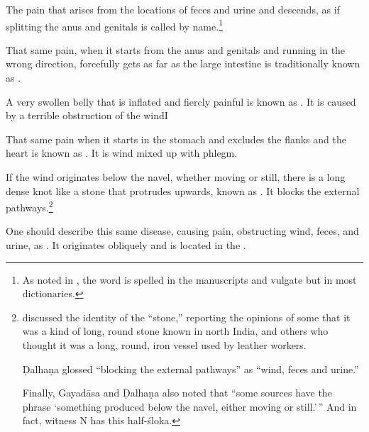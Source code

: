 \begin{translation}
\item[86]

The pain that arises from the locations of feces and urine and
descends, as if splitting the anus and genitals is called
 by name.\footnote{As noted in \cite[124,
    n.\,74]{wuja-2003}, the word is spelled  in the manuscripts
    and vulgate but  in most dictionaries.}

\item[87] 

That same pain, when it starts from the anus and genitals and running
in the wrong direction, forcefully gets as far as the large intestine
is traditionally known as .

\item [88]

A very swollen belly that is inflated and fiercly painful is known as 
.  It is caused by a terrible 
obstruction of the windI

\item [89]

That same pain when it starts in the stomach and excludes the flanks
and the heart is known as .  
It is wind mixed up with phlegm.

\item[90]

If the wind originates below the navel, whether moving or still, there
is a long dense knot like a stone that protrudes upwards, known as
. It blocks the external
pathways.\footnote{ discussed the identity of the
     “stone,” reporting the opinions of some that it was a
    kind of long, round stone known in north India, and others who thought
    it was a long, round, iron vessel used by leather workers.
    
    Ḍalhaṇa glossed  “blocking the external
pathways” as “wind, feces and urine.”
    
    Finally, Gayadāsa and Ḍalhaṇa also noted that “some sources have the 
    phrase  `something 
    produced below the navel, either moving or still.'\,”  And in fact, 
    witness N has this half-śloka.}



\item[91]

One should describe this same disease, causing pain, obstructing
wind, feces, and urine, as
. It originates obliquely and is located in
the .


\end{translation}
